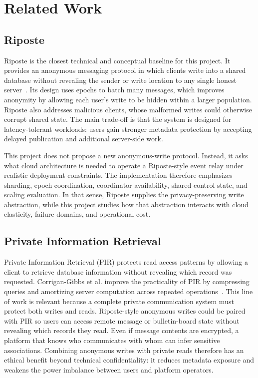 \documentclass[conference]{IEEEtran}
\begin{document}
\section{Related Work}

\subsection{Riposte}

Riposte is the closest technical and conceptual baseline for this project. It provides an anonymous messaging protocol in which clients write into a shared database without revealing the sender or write location to any single honest server~\cite{riposte}. Its design uses epochs to batch many messages, which improves anonymity by allowing each user's write to be hidden within a larger population. Riposte also addresses malicious clients, whose malformed writes could otherwise corrupt shared state. The main trade-off is that the system is designed for latency-tolerant workloads: users gain stronger metadata protection by accepting delayed publication and additional server-side work.

This project does not propose a new anonymous-write protocol. Instead, it asks what cloud architecture is needed to operate a Riposte-style event relay under realistic deployment constraints. The implementation therefore emphasizes sharding, epoch coordination, coordinator availability, shared control state, and scaling evaluation. In that sense, Riposte supplies the privacy-preserving write abstraction, while this project studies how that abstraction interacts with cloud elasticity, failure domains, and operational cost.

\subsection{Private Information Retrieval}

Private Information Retrieval (PIR) protects read access patterns by allowing a client to retrieve database information without revealing which record was requested. Corrigan-Gibbs et al. improve the practicality of PIR by compressing queries and amortizing server computation across repeated operations~\cite{pircompressed}. This line of work is relevant because a complete private communication system must protect both writes and reads. Riposte-style anonymous writes could be paired with PIR so users can access remote message or bulletin-board state without revealing which records they read. Even if message contents are encrypted, a platform that knows who communicates with whom can infer sensitive associations. Combining anonymous writes with private reads therefore has an ethical benefit beyond technical confidentiality: it reduces metadata exposure and weakens the power imbalance between users and platform operators.
\end{document}
